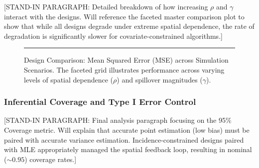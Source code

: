 \documentclass[11pt]{article}
\begin{document}
[STAND-IN PARAGRAPH: Detailed breakdown of how increasing $\rho$ and $\gamma$ interact with the designs. Will reference the faceted master comparison plot to show that while all designs degrade under extreme spatial dependence, the rate of degradation is significantly slower for covariate-constrained algorithms.]

\begin{figure}[htbp]
    \centering
    \rule{0.9\textwidth}{7cm} %
    \caption{Design Comparison: Mean Squared Error (MSE) across Simulation Scenarios. The faceted grid illustrates performance across varying levels of spatial dependence ($\rho$) and spillover magnitudes ($\gamma$).}
    \label{fig:master_comparison}
\end{figure}

\subsubsection{Inferential Coverage and Type I Error Control}

[STAND-IN PARAGRAPH: Final analysis paragraph focusing on the 95\% Coverage metric. Will explain that accurate point estimation (low bias) must be paired with accurate variance estimation. Incidence-constrained designs paired with MLE appropriately managed the spatial feedback loop, resulting in nominal ($\sim 0.95$) coverage rates.]
\end{document}
